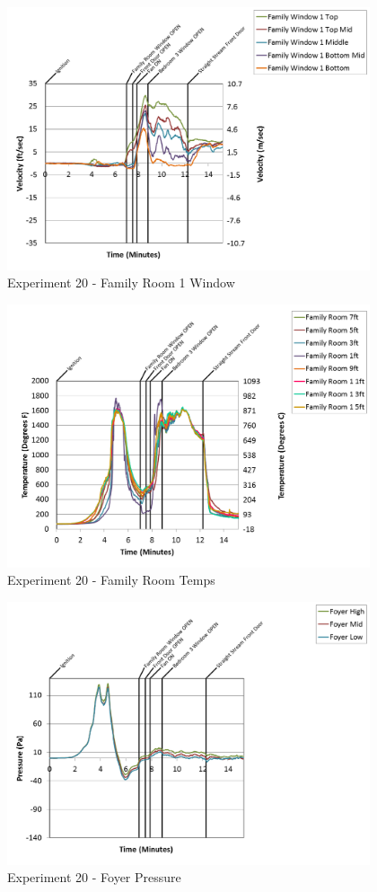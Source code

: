 \documentclass{article}
\begin{document}
\begin{appendices}
\clearpage

\begin{figure}[h!]
	\centering
	\includegraphics[height=3.05in]{0_Images/Results_Charts/Exp_20_Charts/FamilyRoom1Window.png}
	\caption{Experiment 20 - Family Room 1 Window}
\end{figure}


\begin{figure}[h!]
	\centering
	\includegraphics[height=3.05in]{0_Images/Results_Charts/Exp_20_Charts/FamilyRoomTemps.png}
	\caption{Experiment 20 - Family Room Temps}
\end{figure}

\clearpage

\begin{figure}[h!]
	\centering
	\includegraphics[height=3.05in]{0_Images/Results_Charts/Exp_20_Charts/FoyerPressure.png}
	\caption{Experiment 20 - Foyer Pressure}
\end{figure}



\end{appendices}
\end{document}
